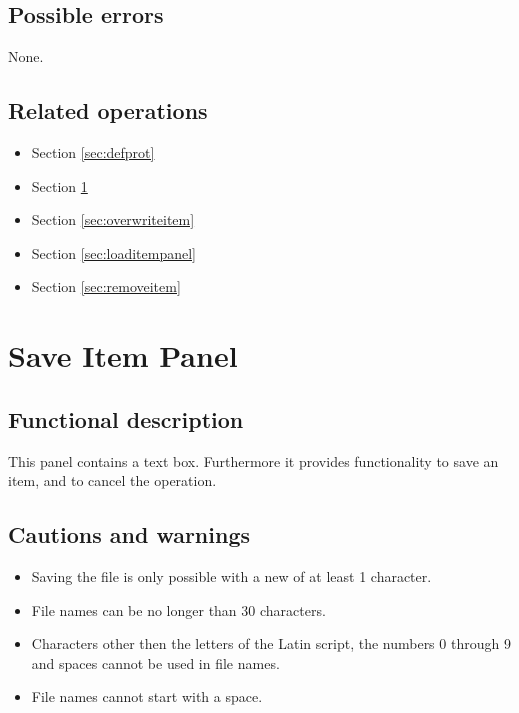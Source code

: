  \subsection*{Possible errors}
  None.
  
  \subsection*{Related operations}
    \begin{itemize}
    \item Section \ref{sec:defprot}
    \item Section \ref{sec:saveitem}
    \item Section \ref{sec:overwriteitem}
    \item Section \ref{sec:loaditempanel}
    \item Section \ref{sec:removeitem}
  \end{itemize}

\section{Save Item Panel}
\label{sec:saveitem}
  \subsection*{Functional description}
  This panel contains a text box. Furthermore it provides functionality to save an item, and to cancel the operation.

  \subsection*{Cautions and warnings}
  \begin{itemize}
  \item Saving the file is only possible with a new of at least 1 character.
  \item File names can be no longer than 30 characters.
  \item Characters other then the letters of the Latin script, the numbers 0 through 9 and spaces cannot be used in file names.
  \item File names cannot start with a space.
  \end{itemize}

